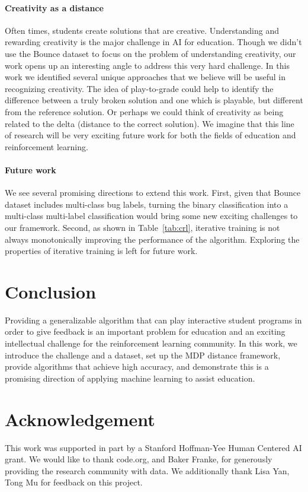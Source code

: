 \documentclass{article}
\newcommand{\EDIT}[1]{#1}%
\begin{document}
\paragraph{Creativity as a distance} Often times, students create solutions that are creative. Understanding and rewarding creativity is the major challenge in AI for education. Though we didn’t use the Bounce dataset to focus on the problem of understanding creativity, our work opens up an interesting angle to address this very hard challenge. In this work we identified several unique approaches that we believe will be useful in recognizing creativity. The idea of play-to-grade could help to identify the difference between a truly broken solution and one which is playable, but different from the reference solution. Or perhaps we could think of creativity as being related to the delta (distance to the correct solution). We imagine that this line of research will be very exciting future work for both the fields of education and reinforcement learning.



\EDIT{\paragraph{Future work} We see several promising directions to extend this work. First, given that Bounce dataset includes multi-class bug labels, turning the binary classification into a multi-class multi-label classification would bring some new exciting challenges to our framework. Second, as shown in Table~\ref{tab:crl}, iterative training is not always monotonically improving the performance of the algorithm. Exploring the properties of iterative training is left for future work.}

\section{Conclusion}
Providing a generalizable algorithm that can play interactive student programs in order to give feedback is an important problem for education and an exciting intellectual challenge for the reinforcement learning community. In this work, we introduce the challenge and a dataset, set up the MDP distance framework, provide algorithms that achieve high accuracy, and demonstrate this is a promising direction of applying machine learning to assist education.

\section*{Acknowledgement} 
This work was supported in part by a Stanford Hoffman-Yee Human Centered AI grant. We would like to thank code.org, and Baker Franke, for generously providing the research community with data. We additionally thank Lisa Yan, Tong Mu for feedback on this project.
\end{document}
